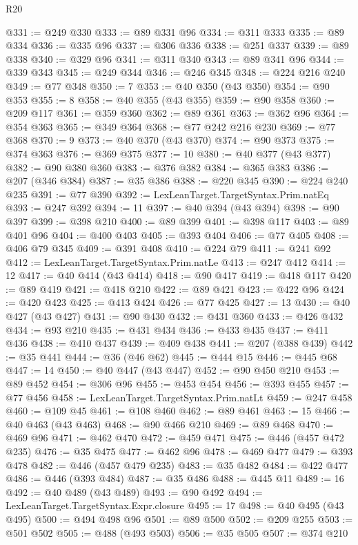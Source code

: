 \begin{lexlean}{R20}
\begin{coremodule}
@331 := @249 @330
@333 := @89 @331 @96
@334 := @311 @333
@335 := @89 @334
@336 := @335 @96
@337 := @306 @336
@338 := @251 @337
@339 := @89 @338
@340 := @329 @96
@341 := @311 @340
@343 := @89 @341 @96
@344 := @339 @343
@345 := @249 @344
@346 := @246 @345
@348 := @224 @216 @240
@349 := @77 @348
@350 := 7
@353 := @40 @350 (@43 @350)
@354 := @90 @353
@355 := 8
@358 := @40 @355 (@43 @355)
@359 := @90 @358
@360 := @209 @117
@361 := @359 @360
@362 := @89 @361
@363 := @362 @96
@364 := @354 @363
@365 := @349 @364
@368 := @77 @242 @216 @230
@369 := @77 @368
@370 := 9
@373 := @40 @370 (@43 @370)
@374 := @90 @373
@375 := @374 @363
@376 := @369 @375
@377 := 10
@380 := @40 @377 (@43 @377)
@382 := @90 @380 @360
@383 := @376 @382
@384 := @365 @383
@386 := @207 (@346 @384)
@387 := @35 @386
@388 := @220 @345
@390 := @224 @240 @235
@391 := @77 @390
@392 := LexLeanTarget.TargetSyntax.Prim.natEq
@393 := @247 @392
@394 := 11
@397 := @40 @394 (@43 @394)
@398 := @90 @397
@399 := @398 @210
@400 := @89 @399
@401 := @398 @117
@403 := @89 @401 @96
@404 := @400 @403
@405 := @393 @404
@406 := @77 @405
@408 := @406 @79 @345
@409 := @391 @408
@410 := @224 @79
@411 := @241 @92
@412 := LexLeanTarget.TargetSyntax.Prim.natLe
@413 := @247 @412
@414 := 12
@417 := @40 @414 (@43 @414)
@418 := @90 @417
@419 := @418 @117
@420 := @89 @419
@421 := @418 @210
@422 := @89 @421
@423 := @422 @96
@424 := @420 @423
@425 := @413 @424
@426 := @77 @425
@427 := 13
@430 := @40 @427 (@43 @427)
@431 := @90 @430
@432 := @431 @360
@433 := @426 @432
@434 := @93 @210
@435 := @431 @434
@436 := @433 @435
@437 := @411 @436
@438 := @410 @437
@439 := @409 @438
@441 := @207 (@388 @439)
@442 := @35 @441
@444 := @36 (@46 @62)
@445 := @444 @15
@446 := @445 @68
@447 := 14
@450 := @40 @447 (@43 @447)
@452 := @90 @450 @210
@453 := @89 @452
@454 := @306 @96
@455 := @453 @454
@456 := @393 @455
@457 := @77 @456
@458 := LexLeanTarget.TargetSyntax.Prim.natLt
@459 := @247 @458
@460 := @109 @45
@461 := @108 @460
@462 := @89 @461
@463 := 15
@466 := @40 @463 (@43 @463)
@468 := @90 @466 @210
@469 := @89 @468
@470 := @469 @96
@471 := @462 @470
@472 := @459 @471
@475 := @446 (@457 @472 @235)
@476 := @35 @475
@477 := @462 @96
@478 := @469 @477
@479 := @393 @478
@482 := @446 (@457 @479 @235)
@483 := @35 @482
@484 := @422 @477
@486 := @446 (@393 @484)
@487 := @35 @486
@488 := @445 @11
@489 := 16
@492 := @40 @489 (@43 @489)
@493 := @90 @492
@494 := LexLeanTarget.TargetSyntax.Expr.closure
@495 := 17
@498 := @40 @495 (@43 @495)
@500 := @494 @498 @96
@501 := @89 @500
@502 := @209 @255
@503 := @501 @502
@505 := @488 (@493 @503)
@506 := @35 @505
@507 := @374 @210

\end{coremodule}
\end{lexlean}

